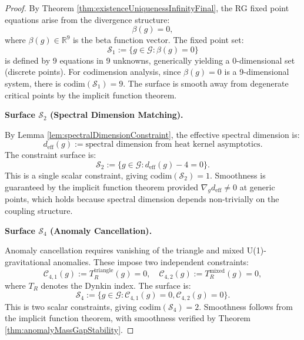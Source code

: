 \begin{theorem}
\begin{proof}
By Theorem \ref{thm:existenceUniquenessInfinityFinal}, the RG fixed point equations arise from the divergence structure:
\begin{equation}
\beta(g) = 0,
\end{equation}
where $\beta(g) \in \mathbb{R}^9$ is the beta function vector. The fixed point set:
\begin{equation}
\mathcal{S}_1 := \{g \in \mathcal{G} : \beta(g) = 0\}
\end{equation}
is defined by 9 equations in 9 unknowns, generically yielding a 0-dimensional set (discrete points). For codimension analysis, since $\beta(g) = 0$ is a 9-dimensional system, there is $\text{codim}(\mathcal{S}_1) = 9$. The surface is smooth away from degenerate critical points by the implicit function theorem.

\textbf{Surface $\mathcal{S}_2$ (Spectral Dimension Matching).}

By Lemma \ref{lem:spectralDimensionConstraint}, the effective spectral dimension is:
\begin{equation}
d_{\text{eff}}(g) := \text{spectral dimension from heat kernel asymptotics}.
\end{equation}
The constraint surface is:
\begin{equation}
\mathcal{S}_2 := \{g \in \mathcal{G} : d_{\text{eff}}(g) - 4 = 0\}.
\end{equation}
This is a single scalar constraint, giving $\text{codim}(\mathcal{S}_2) = 1$. Smoothness is guaranteed by the implicit function theorem provided $\nabla_g d_{\text{eff}} \neq 0$ at generic points, which holds because spectral dimension depends non-trivially on the coupling structure.

\textbf{Surface $\mathcal{S}_4$ (Anomaly Cancellation).}

Anomaly cancellation requires vanishing of the triangle and mixed U(1)-gravitational anomalies. These impose two independent constraints:
\begin{equation}
\mathcal{C}_{4,1}(g) := T_R^{\text{triangle}}(g) = 0, \quad \mathcal{C}_{4,2}(g) := T_R^{\text{mixed}}(g) = 0,
\end{equation}
where $T_R$ denotes the Dynkin index. The surface is:
\begin{equation}
\mathcal{S}_4 := \{g \in \mathcal{G} : \mathcal{C}_{4,1}(g) = 0, \mathcal{C}_{4,2}(g) = 0\}.
\end{equation}
This is two scalar constraints, giving $\text{codim}(\mathcal{S}_4) = 2$. Smoothness follows from the implicit function theorem, with smoothness verified by Theorem \ref{thm:anomalyMassGapStability}.


\end{proof}
\end{theorem}
